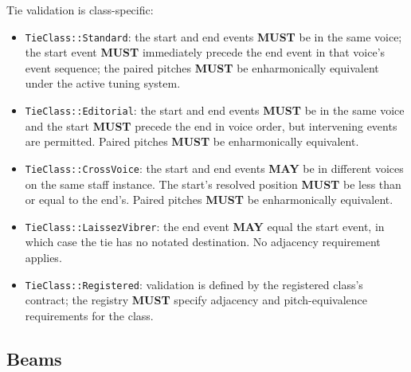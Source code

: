 \documentclass[11pt,letterpaper]{report}
\newcounter{requirement}[chapter]
\newcommand{\MUST}{\textbf{MUST}}
\newcommand{\MAY}{\textbf{MAY}}
\begin{document}
\begin{requirement}
  \label{req:graph:tie-class-validation}
  Tie validation is class-specific:

  \begin{itemize}
    \item \texttt{TieClass::Standard}: the start and end events
      \MUST{} be in the same voice; the start event \MUST{}
      immediately precede the end event in that voice's event
      sequence; the paired pitches \MUST{} be enharmonically
      equivalent under the active tuning system.
    \item \texttt{TieClass::Editorial}: the start and end events
      \MUST{} be in the same voice and the start \MUST{} precede the
      end in voice order, but intervening events are permitted.
      Paired pitches \MUST{} be enharmonically equivalent.
    \item \texttt{TieClass::CrossVoice}: the start and end events
      \MAY{} be in different voices on the same staff instance. The
      start's resolved position \MUST{} be less than or equal to
      the end's. Paired pitches \MUST{} be enharmonically equivalent.
    \item \texttt{TieClass::LaissezVibrer}: the end event \MAY{}
      equal the start event, in which case the tie has no notated
      destination. No adjacency requirement applies.
    \item \texttt{TieClass::Registered}: validation is defined by
      the registered class's contract; the registry \MUST{} specify
      adjacency and pitch-equivalence requirements for the class.
  \end{itemize}
\end{requirement}

\subsection{Beams}
\end{document}
